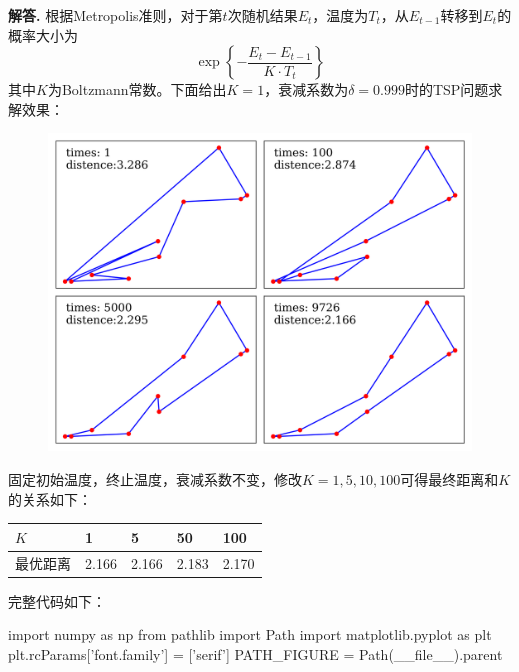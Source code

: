 \documentclass[12pt, a4paper, oneside]{ctexart}
\newenvironment{solution}[1][]{\par\noindent\textbf{#1解答. }}{\smallskip\par}  %
\begin{document}
\begin{solution}
    根据Metropolis准则，对于第$t$次随机结果$E_t$，温度为$T_t$，从$E_{t-1}$转移到$E_t$的概率大小为
    \begin{equation*}
        \exp\left\{-\frac{E_t - E_{t-1}}{K\cdot T_t}\right\}
    \end{equation*}
    其中$K$为Boltzmann常数。下面给出$K=1$，衰减系数为$\delta = 0.999$时的TSP问题求解效果：
\begin{figure}[htbp]
    \centering
    \includegraphics[scale=0.6]{simulated_annealing/TSP.png}
\end{figure}

    固定初始温度，终止温度，衰减系数不变，修改$K=1,5,10,100$可得最终距离和$K$的关系如下：
\renewcommand\arraystretch{0.8} %
\begin{table}[!htbp] %
    \centering %
    \begin{tabular}{p{2cm}<{\centering}p{2cm}<{\centering}p{2cm}<{\centering}p{2cm}<{\centering}p{2cm}<{\centering}} %
        \toprule
        $K$ & 1 & 5 & 50 & 100 \\
        \midrule
        最优距离 & 2.166 & 2.166 & 2.183 & 2.170 \\
        \bottomrule
    \end{tabular}
\end{table}

\clearpage
完整代码如下：
\begin{pythoncode}
import numpy as np
from pathlib import Path
import matplotlib.pyplot as plt
plt.rcParams['font.family'] = ['serif']
PATH_FIGURE = Path(__file__).parent


\end{pythoncode}
\end{solution}
\end{document}
